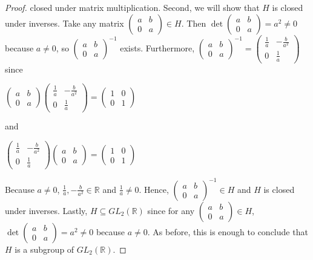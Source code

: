 \documentclass[10pt]{article}
\begin{document}
\begin{itemize}
\begin{itemize}
\begin{proof}
		closed under matrix multiplication. Second, we will show that $H$ is
		closed under inverses. Take any matrix $\begin{pmatrix}a & b \\ 0 & a\end{pmatrix}
		\in H$. Then $\det\begin{pmatrix}a & b \\ 0 & a\end{pmatrix} = a^2 \neq 0$ because
		$a \neq 0$, so $\begin{pmatrix}a & b \\ 0 & a\end{pmatrix}^{-1}$ exists. Furthermore,
		$\begin{pmatrix}a & b \\ 0 & a\end{pmatrix}^{-1} =
		\begin{pmatrix} \frac{1}{a} & -\frac{b}{a^2} \\ 0 & \frac{1}{a}\end{pmatrix}$ since
			\begin{center}
				$\begin{pmatrix}a & b \\ 0 & a\end{pmatrix}
				\begin{pmatrix}\frac{1}{a} &-\frac{b}{a^2} \\ 0 & \frac{1}{a}\end{pmatrix} =
				\begin{pmatrix}1 & 0 \\ 0 & 1\end{pmatrix}$
			\end{center}
		and
			\begin{center}
				$\begin{pmatrix}\frac{1}{a} &-\frac{b}{a^2} \\ 0 & \frac{1}{a}\end{pmatrix}
				\begin{pmatrix}a & b \\ 0 & a\end{pmatrix} =
				\begin{pmatrix}1 & 0 \\ 0 & 1\end{pmatrix}$
			\end{center}
		Because $a \neq 0$, $\frac{1}{a}, -\frac{b}{a^2} \in \mathbb{R}$ and $\frac{1}{a} \neq 0$.
		Hence, $\begin{pmatrix}a & b \\ 0 & a\end{pmatrix}^{-1} \in H$ and $H$ is closed under
		inverses. Lastly, $H \subseteq GL_2(\mathbb{R})$ since for any
		$\begin{pmatrix}a & b \\ 0 & a\end{pmatrix} \in H$,
		$\det\begin{pmatrix}a & b \\ 0 & a\end{pmatrix} = a^2 \neq 0$ because $a \neq 0$.
		As before, this is enough to conclude that $H$ is a subgroup of $GL_2(\mathbb{R})$.
			

\end{proof}
\end{itemize}
\end{itemize}
\end{document}

